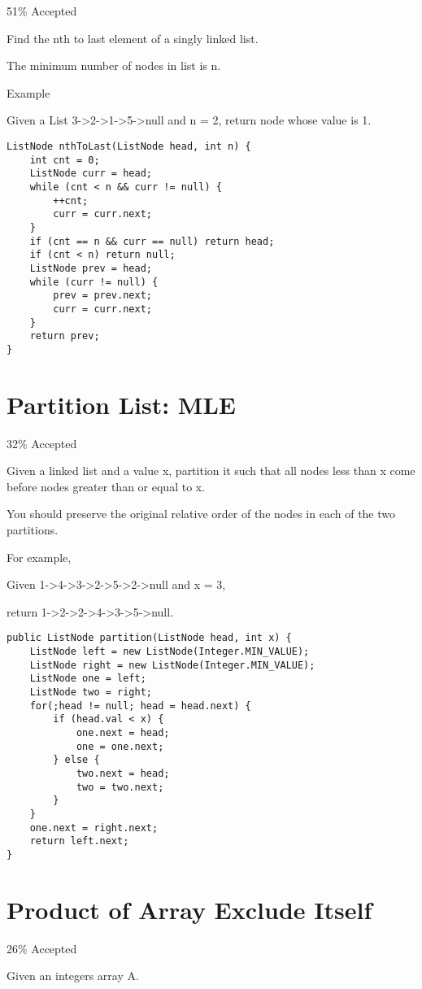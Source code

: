 \documentclass[9pt, b5paaper]{book}
\begin{document}
51\% Accepted

Find the nth to last element of a singly linked list. 

The minimum number of nodes in list is n.

Example

Given a List  3->2->1->5->null and n = 2, return node  whose value is 1.
\begin{verbatim}
ListNode nthToLast(ListNode head, int n) {
    int cnt = 0;
    ListNode curr = head;
    while (cnt < n && curr != null) {
        ++cnt;
        curr = curr.next;
    }
    if (cnt == n && curr == null) return head;
    if (cnt < n) return null;
    ListNode prev = head;
    while (curr != null) {
        prev = prev.next;
        curr = curr.next;
    }
    return prev;
}
\end{verbatim}
\section{Partition List: MLE}
\label{sec-1-52}

32\% Accepted

Given a linked list and a value x, partition it such that all nodes less than x come before nodes greater than or equal to x.

You should preserve the original relative order of the nodes in each of the two partitions.

For example,

Given 1->4->3->2->5->2->null and x = 3,

return 1->2->2->4->3->5->null.
\begin{verbatim}
public ListNode partition(ListNode head, int x) {
    ListNode left = new ListNode(Integer.MIN_VALUE);
    ListNode right = new ListNode(Integer.MIN_VALUE);
    ListNode one = left;
    ListNode two = right;
    for(;head != null; head = head.next) {
        if (head.val < x) {
            one.next = head;
            one = one.next;
        } else {
            two.next = head;
            two = two.next;
        }
    }
    one.next = right.next;
    return left.next;
}
\end{verbatim}
\section{Product of Array Exclude Itself}
\label{sec-1-53}

26\% Accepted

Given an integers array A.
\end{document}
